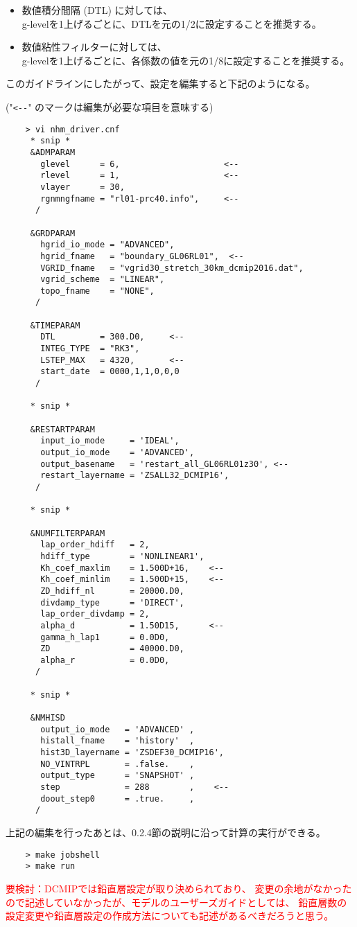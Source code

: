  \begin{itemize}
   \item 数値積分間隔 (DTL) に対しては、 \\
   {\sf g-levelを1上げるごとに、DTLを元の1/2に設定することを推奨する}。
   \item 数値粘性フィルターに対しては、 \\
   {\sf g-levelを1上げるごとに、各係数の値を元の1/8に設定することを推奨する}。 \\
 \end{itemize}

 \noindent このガイドラインにしたがって、設定を編集すると下記のようになる。

 ("\verb|<--|" のマークは編集が必要な項目を意味する)
 \begin{verbatim}
    > vi nhm_driver.cnf
     * snip *
     &ADMPARAM
       glevel      = 6,                     <--
       rlevel      = 1,                     <--
       vlayer      = 30,
       rgnmngfname = "rl01-prc40.info",     <--
      /

     &GRDPARAM
       hgrid_io_mode = "ADVANCED",
       hgrid_fname   = "boundary_GL06RL01",  <--
       VGRID_fname   = "vgrid30_stretch_30km_dcmip2016.dat",
       vgrid_scheme  = "LINEAR",
       topo_fname    = "NONE",
      /

     &TIMEPARAM
       DTL         = 300.D0,     <--
       INTEG_TYPE  = "RK3",
       LSTEP_MAX   = 4320,       <--
       start_date  = 0000,1,1,0,0,0
      /

     * snip *

     &RESTARTPARAM
       input_io_mode     = 'IDEAL',
       output_io_mode    = 'ADVANCED',
       output_basename   = 'restart_all_GL06RL01z30', <--
       restart_layername = 'ZSALL32_DCMIP16',
      /

     * snip *

     &NUMFILTERPARAM
       lap_order_hdiff   = 2,
       hdiff_type        = 'NONLINEAR1',
       Kh_coef_maxlim    = 1.500D+16,    <--
       Kh_coef_minlim    = 1.500D+15,    <--
       ZD_hdiff_nl       = 20000.D0,
       divdamp_type      = 'DIRECT',
       lap_order_divdamp = 2,
       alpha_d           = 1.50D15,      <--
       gamma_h_lap1      = 0.0D0,
       ZD                = 40000.D0,
       alpha_r           = 0.0D0,
      /

     * snip *

     &NMHISD
       output_io_mode   = 'ADVANCED' ,
       histall_fname    = 'history'  ,
       hist3D_layername = 'ZSDEF30_DCMIP16',
       NO_VINTRPL       = .false.    ,
       output_type      = 'SNAPSHOT' ,
       step             = 288        ,    <--
       doout_step0      = .true.     ,
      /
 \end{verbatim}

 \noindent 上記の編集を行ったあとは、0.2.4節の説明に沿って計算の実行ができる。
 \begin{verbatim}
    > make jobshell
    > make run
 \end{verbatim}


\textcolor{red}{要検討：DCMIPでは鉛直層設定が取り決められており、
変更の余地がなかったので記述していなかったが、モデルのユーザーズガイドとしては、
鉛直層数の設定変更や鉛直層設定の作成方法についても記述があるべきだろうと思う。}
